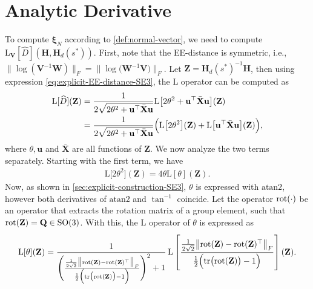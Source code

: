 \section{Analytic Derivative}
To compute $\boldsymbol{\xi}_N$ according to \cref{def:normal-vector}, we need to compute $\text{L}_{\mathbf{V}}[\widehat{D}](\mathbf{H}, \mathbf{H}_d(s^*))$. First, note that the EE-distance is symmetric, i.e., $\bigl\|\log(\mathbf{V}^{-1}\mathbf{W})\bigr\|_F = \bigl\|\log\bigl(\mathbf{W}^{-1}\mathbf{V}\bigr)\bigr\|_F$. Let $\mathbf{Z}=\mathbf{H}_d(s^*)^{-1}\mathbf{H}$, then using expression \eqref{eq:explicit-EE-distance-SE3}, the $\text{L}$ operator can be computed as
\begin{align}
    \begin{split}
        \text{L}[\widehat{D}](\mathbf{Z}) &=  \frac{1}{2\sqrt{2\theta^2 + \mathbf{u}^\top\bar{\mathbf{X}}\mathbf{u}}} \text{L}\bigl[2\theta^2 + \mathbf{u}^\top\bar{\mathbf{X}}\mathbf{u}\bigr](\mathbf{Z}) \\
        &= \frac{1}{2\sqrt{2\theta^2 + \mathbf{u}^\top\bar{\mathbf{X}}\mathbf{u}}} \Bigl(\text{L}\bigl[2\theta^2\bigr](\mathbf{Z}) + \text{L}\bigl[\mathbf{u}^\top\bar{\mathbf{X}}\mathbf{u}\bigr](\mathbf{Z})\Bigr), \label{eq:explicit-derivative-SE3-LdhatZ-firststep}
    \end{split}
\end{align}
where $\theta, \mathbf{u}$ and $\bar{\mathbf{X}}$ are all functions of $\mathbf{Z}$. We now analyze the two terms separately. Starting with the first term, we have
\begin{align}
    \text{L}\bigl[2\theta^2\bigr](\mathbf{Z}) = 4\theta \text{L}[\theta](\mathbf{Z}).
\end{align}
Now, as shown in \cref{sec:explicit-construction-SE3}, $\theta$ is expressed with $\text{atan2}$, however both derivatives of $\text{atan2}$ and $\tan^{-1}$ coincide. Let the operator $\operatorname{rot}(\cdot)$ be an operator that extracts the rotation matrix of a group element, such that $\operatorname{rot}(\mathbf{Z})=\mathbf{Q}\in\text{SO}(3)$. With this, the $\text{L}$ operator of $\theta$ is expressed as
\begin{align}
    \text{L}[\theta](\mathbf{Z}) = \frac{1}{\Biggl(\frac{\frac{1}{2\sqrt{2}}\bigl\|\rot(\mathbf{Z}) - \rot(\mathbf{Z})^\top\bigr\|_F}{\frac{1}{2}\Bigl(\tr\bigl(\rot(\mathbf{Z})\bigr)-1\Bigr)}\Biggr)^2+1} \Lop\left[\rule{0em}{9mm}\frac{\frac{1}{2\sqrt{2}}\bigl\|\rot(\mathbf{Z}) - \rot(\mathbf{Z})^\top\bigr\|_F}{\frac{1}{2}\Bigl(\tr\bigl(\rot(\mathbf{Z})\bigr)-1\Bigr)}\right](\mathbf{Z}). \label{eq:explicit-derivative-SE3-LthetaZ}
\end{align}
